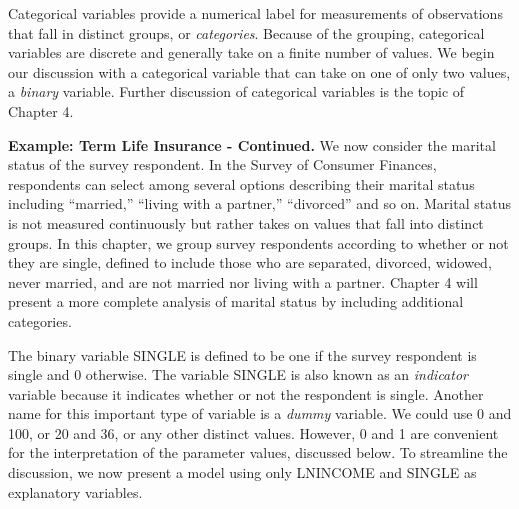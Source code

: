 Categorical variables provide a numerical label for measurements of
observations that fall in distinct groups, or \emph{categories}.
Because of the grouping, categorical variables are discrete and
generally take on a finite number of values. We begin our discussion
with a categorical variable that can take on one of only two values,
a \emph{binary} variable. Further discussion of categorical
variables is the topic of Chapter 4.


\linejed {}

\textbf{Example: Term Life Insurance - Continued.} We now consider
the marital status of the survey respondent. In the Survey of
Consumer Finances, respondents can select among several options
describing their marital status including ``married,'' ``living with
a partner,'' ``divorced'' and so on. Marital status is not measured
continuously but rather takes on values that fall into distinct
groups. In this chapter, we group survey respondents according to
whether or not they are single, defined to include those who are
separated, divorced, widowed, never married, and are not married nor
living with a partner. Chapter 4 will present a more complete
analysis of marital status by including additional categories.


The binary variable SINGLE is defined to be one if the survey
respondent is single and 0 otherwise. The variable SINGLE is also
known as an \emph{indicator} variable because it indicates whether
or not the respondent is single. Another name for this important
type of variable is a \emph{dummy} variable. We could use 0 and 100,
or 20 and 36, or any other distinct values. However, 0 and 1 are
convenient for the interpretation of the parameter values, discussed
below. To streamline the discussion, we now present a model using
only LNINCOME and SINGLE as explanatory variables.


